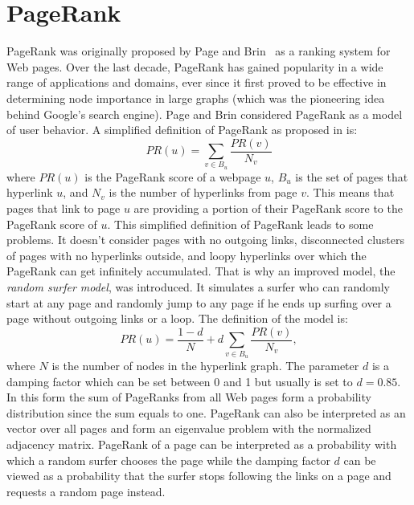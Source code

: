 \documentclass[11pt,oneside]{book}
\let\Oldsection\section
\renewcommand{\section}{\FloatBarrier\Oldsection}
\begin{document}
\section{PageRank}
\label{sec:pagerank_related}
PageRank was originally proposed by Page and Brin~\citep{page1999pagerank} as a ranking system
for Web pages. Over the last decade, PageRank has gained popularity  in a wide range of applications and domains, ever since it first proved to be  effective in determining node importance in large graphs (which was the pioneering idea behind Google's search engine). Page and Brin considered PageRank as a model of user behavior.
\noindent
A simplified definition of PageRank as proposed in \citep{page1999pagerank} is:
\begin{equation}
 PR(u)=\sum_{v\in B_u}\frac{PR(v)}{N_v}
\end{equation}
where $PR(u)$ is the PageRank score of a webpage $u$, $B_u$ is the set of pages that hyperlink $u$, and $N_v$ is the number of hyperlinks from page $v$. This means that pages that link to page $u$ are providing a portion of their PageRank score to the PageRank score of $u$. %
This simplified definition of PageRank leads to some problems. It doesn't consider pages with no outgoing links, disconnected clusters of pages with no hyperlinks outside, and loopy hyperlinks over which the PageRank can get infinitely accumulated. That is why an improved model, the \textit{random surfer model}, was introduced. It simulates a surfer who can randomly start at any page and randomly jump to any page if he ends up surfing over a page without outgoing links or a loop. The definition of the model is:
\begin{equation}
 PR(u) = \frac{1-d}{N}+d\sum_{v\in B_u}\frac{PR(v)}{N_v},
\end{equation}
where $N$ is the number of nodes in the hyperlink graph. The parameter $d$ is a damping factor which can be set between 0 and 1 but usually is set to $d=0.85$. In this form the sum of PageRanks from all Web pages form a probability distribution since the sum equals to one. PageRank can also be interpreted as an vector over all pages and form an eigenvalue problem with the normalized adjacency matrix. PageRank of a page can be interpreted as a probability with which a random surfer chooses the page while the damping factor $d$ can be viewed as a probability that the surfer stops following the links on a page and requests a random page instead.
\end{document}
